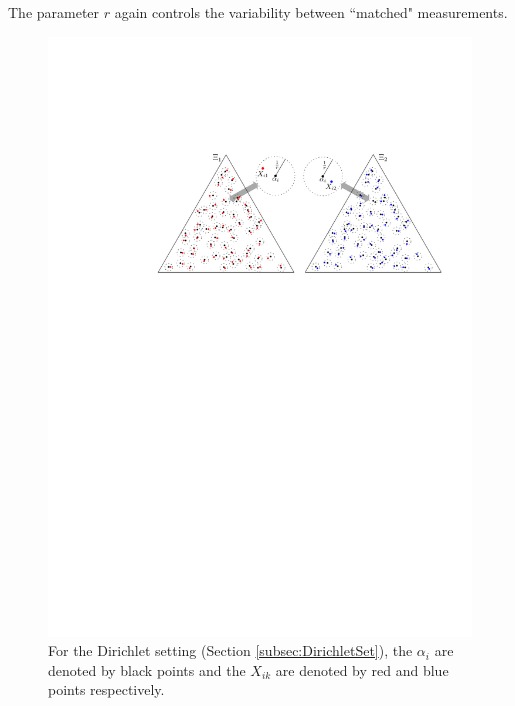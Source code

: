 \documentclass[11pt]{article} %
\begin{document}
 The parameter $r$ again controls the variability between ``matched" measurements.
    \begin{figure}
	\begin{center}
    \includegraphics[scale=0.75]{Dirichlet_alpha_r_multiple_sancar.pdf}
   \caption{ For the  Dirichlet setting (Section \ref{subsec:DirichletSet}),  the $\alpha_i$ are denoted by black points and the $X_{ik}$ are denoted by red and blue points respectively.}
\label{fig:Fig2}
	\end{center}
  \end{figure}
\end{document}
